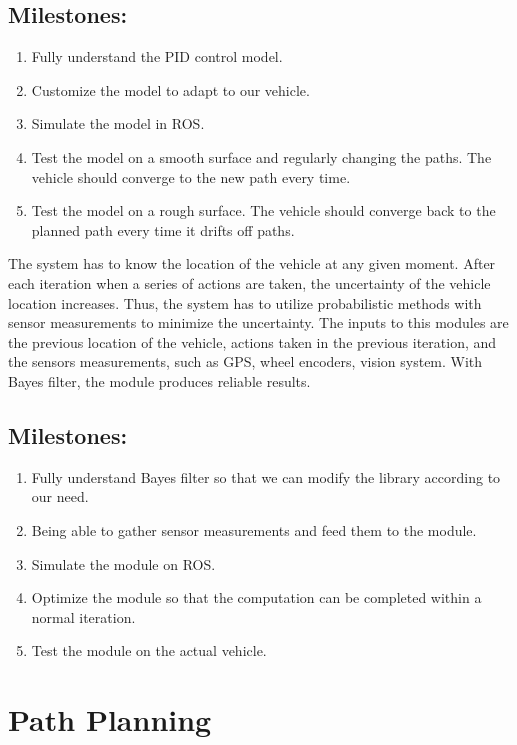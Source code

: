 \documentclass[compsoc,draftclsnofoot,onecolumn,10pt]{IEEEtran}
\begin{document}
\subsection{Milestones:}
\begin{enumerate}
	\item Fully understand the PID control model.
	\item Customize the model to adapt to our vehicle.
	\item Simulate the model in ROS.
	\item Test the model on a smooth surface and regularly changing the paths. The vehicle should converge to the new path every time.
	\item Test the model on a rough surface. The vehicle should converge back to the planned path every time it drifts off paths.
\end{enumerate}

The system has to know the location of the vehicle at any given moment. After each iteration when a series of actions are taken, the uncertainty of the vehicle location increases. Thus, the system has to utilize probabilistic methods with sensor measurements to minimize the uncertainty. The inputs to this modules are the previous location of the vehicle, actions taken in the previous iteration, and the sensors measurements, such as GPS, wheel encoders, vision system. With Bayes filter, the module produces reliable results.\par
\subsection{Milestones:}
\begin{enumerate}
	\item Fully understand Bayes filter so that we can modify the library according to our need.
	\item Being able to gather sensor measurements and feed them to the module.
	\item Simulate the module on ROS.
	\item Optimize the module so that the computation can be completed within a normal iteration.
	\item Test the module on the actual vehicle.
\end{enumerate}

\section{Path Planning}
\end{document}

